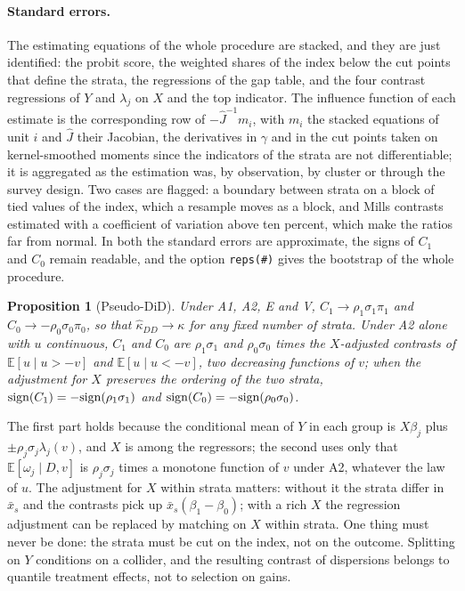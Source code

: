 \documentclass[11pt,a4paper]{article}
\theoremstyle{plain}
\newtheorem{proposition}{Proposition}
\theoremstyle{definition}
\theoremstyle{remark}
\newcommand{\E}{\mathbb{E}}
\newcommand{\1}{\mathbf{1}}
\newcommand{\cmd}[1]{\texttt{#1}}
\begin{document}
\paragraph{Standard errors.}
The estimating equations of the whole procedure are stacked, and they are
just identified: the probit score, the weighted shares of the index below
the cut points that define the strata, the regressions of the gap table,
and the four contrast regressions of $Y$ and $\lambda_j$ on $X$ and the
top indicator. The influence function of each estimate is the
corresponding row of $-\hat J^{-1}m_i$, with $m_i$ the stacked equations of
unit $i$ and $\hat J$ their Jacobian, the derivatives in $\gamma$ and in
the cut points taken on kernel-smoothed moments since the indicators of
the strata are not differentiable; it is aggregated as the estimation
was, by observation, by cluster or through the survey design. Two cases
are flagged: a boundary between strata on a block of tied values of the
index, which a resample moves as a block, and Mills contrasts estimated
with a coefficient of variation above ten percent, which make the ratios
far from normal. In both the standard errors are approximate, the signs
of $C_1$ and $C_0$ remain readable, and the option \cmd{reps(\#)} gives
the bootstrap of the whole procedure.

\begin{proposition}[Pseudo-DiD]\label{prop:pdid}
Under A1, A2, E and V, $C_1\to\rho_1\sigma_1\pi_1$ and
$C_0\to-\rho_0\sigma_0\pi_0$, so that $\hat\kappa_{DD}\to\kappa$ for any
fixed number of strata. Under A2 alone with $u$ continuous, $C_1$ and
$C_0$ are $\rho_1\sigma_1$ and $\rho_0\sigma_0$ times the $X$-adjusted
contrasts of $\E[u\mid u>-v]$ and $\E[u\mid u<-v]$, two decreasing
functions of $v$; when the adjustment for $X$ preserves the ordering of
the two strata, ${\rm sign}(C_1)=-{\rm sign}(\rho_1\sigma_1)$ and
${\rm sign}(C_0)=-{\rm sign}(\rho_0\sigma_0)$.
\end{proposition}

The first part holds because the conditional mean of $Y$ in each group is
$X\beta_j$ plus $\pm\rho_j\sigma_j\lambda_j(v)$, and $X$ is among the
regressors; the second uses only that $\E[\omega_j\mid D,v]$ is
$\rho_j\sigma_j$ times a monotone function of $v$ under A2, whatever the
law of $u$. The adjustment for $X$ within strata matters: without it the
strata differ in $\bar x_s$ and the contrasts pick up
$\bar x_s(\beta_1-\beta_0)$; with a rich $X$ the regression adjustment can
be replaced by matching on $X$ within strata. One thing must never be
done: the strata must be cut on the index, not on the outcome. Splitting
on $Y$ conditions on a collider, and the resulting contrast of
dispersions belongs to quantile treatment effects, not to selection on
gains.
\end{document}
